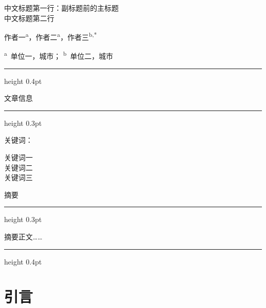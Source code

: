 \documentclass[10pt]{ctexart}
\newcommand{\kai}{\CJKfamily{kai}}
\begin{document}
\begin{flushleft}
  {\heiti\fontsize{20pt}{25pt}\selectfont
   中文标题第一行：副标题前的主标题\\[2pt]
   中文标题第二行\par}
\end{flushleft}

\vspace{8pt}
{\noindent\fontsize{11pt}{14pt}\selectfont
作者一\textsuperscript{a}，作者二\textsuperscript{a}，作者三\textsuperscript{b,*}\par}

\vspace{6pt}
{\noindent\footnotesize\kai\raggedright
\textsuperscript{a}~单位一，城市；\quad
\textsuperscript{b}~单位二，城市\par}

\vspace{4pt}
\hrule height 0.4pt
\vspace{6pt}

\noindent
\begin{minipage}[t]{0.26\textwidth}
  \vspace{0pt}
  {\footnotesize\heiti 文章信息\par}
  \vspace{3pt}\hrule height 0.3pt\vspace{4pt}
  {\footnotesize\heiti 关键词：\par}
  \vspace{2pt}
  {\footnotesize 关键词一\\关键词二\\关键词三\par}
\end{minipage}%
\hfill
\begin{minipage}[t]{0.70\textwidth}
  \vspace{0pt}
  {\footnotesize\heiti 摘\quad 要\par}
  \vspace{3pt}\hrule height 0.3pt\vspace{4pt}
  {\footnotesize 摘要正文……\par}
\end{minipage}

\vspace{6pt}
\hrule height 0.4pt
\vspace{10pt}

\section{引言}
\end{document}
